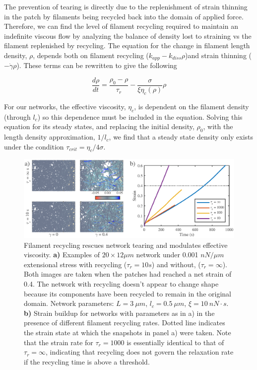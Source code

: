 \documentclass[10pt,letterpaper]{article}
\begin{document}
The prevention of tearing is directly due to the replenishment of strain thinning in the patch by filaments being recycled back into the domain of applied force.  Therefore, we can find the level of filament recycling required to maintain an indefinite viscous flow by analyzing the balance of density lost to straining vs the filament replenished by recycling.  The equation for the change in filament length density, $\rho$, depends both on filament recycling ($k_{app}-k_{diss}\rho$)and strain thinning ($-\dot{\gamma}\rho$).  These terms can be rewritten to give the following 

\begin{equation}
\frac{d \rho}{dt} = \frac{\rho_0-\rho}{\tau_r}  - \frac{\sigma}{\xi \eta_c(\rho)} \rho
\end{equation}

For our networks, the effective viscosity, $\eta_c$, is dependent on the filament density (through $l_c$) so this dependence must be included in the equation. Solving this equation for its steady states, and replacing the initial density, $\rho_0$, with the length density approximation, $1/l_c$, we find that a steady state density only exists under the condition $\tau_{crit}=\eta_c/4\sigma$.  

\begin{figure}[h!]
\centering
\includegraphics[width=\hsize]{figures/figure5a}
\caption{\label{fig:passive_rec}  Filament recycling rescues network tearing and modulates effective viscosity.  \textbf{a)} Examples of $20 \times 12 \mu m$ network under 0.001 $nN/\mu m$ extensional stress with recycling ($\tau_r=10 s$) and without, ($\tau_r=\infty$).  Both images are taken when the patches had reached a net strain of 0.4.  The network with recycling doesn't appear to change shape because its components have been recycled to remain in the original domain.  Network parameters: $L=3\: \mu m$, $l_c=0.5\: \mu m$, $\xi=10\: nN\cdot s$.  \textbf{b)}  Strain buildup for networks with parameters as in a) in the presence of different filament recycling rates. Dotted line indicates the strain state at which the snapshots in panel a) were taken.  Note that the strain rate for $\tau_r=1000$ is essentially identical to that of $\tau_r=\infty$, indicating that recycling does not govern the relaxation rate if the recycling time is above a threshold.}
\end{figure}
\end{document}
